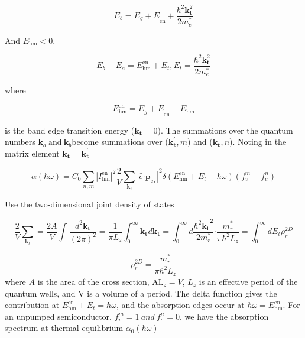 \begin{equation}
E_{b} = {E_{g} + E}_{\text{en}} + \frac{\hbar^{2}\bm{k}_{\bm{t}}^{2}}{2m_{e}^{*}}
\end{equation}

And \(E_{\text{hm}} < 0\),

\begin{equation}
E_{b} - E_{a} = E_{\text{hm}}^{\text{en}} + E_{t},
E_{t} = \frac{\hbar^{2}\bm{k}_{\bm{t}}^{2}}{2m_{e}^{*}}
\end{equation}

where

\begin{equation}
E_{\text{hm}}^{\text{en}} = {E_{g} + E}_{\text{en}} - E_{\text{hm}}
\end{equation}

is the band edge transition energy (\(\bm{k}_{\bm{t}} = 0\)).
The summations over the quantum numbers
\(\bm{k}_{a}\bm{\ }\text{and}\bm{\ }\bm{k}_{b}\)become
summations over (\(\bm{k}_{\bm{t}}^{\bm{'}},m\)) and
(\(\bm{k}_{\bm{t}},n\)). Noting in the matrix element
\(\bm{k}_{\bm{t}}\bm{=}\bm{k}_{\bm{t}}^{\bm{'}}\)

\begin{equation}
\alpha\left( \hbar\omega \right) = C_{0}\sum_{n,m}^{}\left| I_{\text{hm}}^{\text{en}} \right|^{2}\frac{2}{V}\sum_{\bm{k}_{t}}^{}\left| \hat{e}\bm{\cdot}\bm{p}_{\text{cv}} \right|^{2}\delta(E_{\text{hm}}^{\text{en}} + E_{t} - \hbar\omega)(f_{v}^{m} - f_{c}^{n})
\end{equation}

Use the two-dimensional joint density of states

\begin{equation}
\frac{2}{V}\sum_{\bm{k}_{t}}^{}{= \frac{2A}{V}}\int_{}^{}\frac{d^{2}\bm{k}_{\bm{t}}}{\left( 2\pi \right)^{2}} = \frac{1}{\pi L_{z}}\int_{0}^{\infty}\bm{k}_{\bm{t}}d\bm{k}_{\bm{t}}\bm{=}\int_{0}^{\infty}{d\frac{{{\hbar^{2}\bm{k}}_{\bm{t}}}^{\bm{2}}}{2m_{r}^{*}}}\bm{\cdot}\frac{m_{r}^{*}}{\pi\hbar^{2}L_{z}}\bm{=}\int_{0}^{\infty}{dE_{t}}\rho_{r}^{2D}
\end{equation}

\begin{equation}
\rho_{r}^{2D} = \frac{m_{r}^{*}}{\pi\hbar^{2}L_{z}}
\end{equation}
where \(A\) is the area of the cross section, \(\text{AL}_{z} = V\),
\(L_{z}\) is an effective period of the quantum wells, and V is a volume
of a period. The delta function gives the contribution at
\(E_{\text{hm}}^{\text{en}} + E_{t} = \hbar\omega\), and the
absorption edges occur at \(\hbar\omega = E_{\text{hm}}^{\text{en}}\).
For an unpumped semiconductor, \(f_{v}^{m} = 1\ and\ f_{c}^{n} = 0\), we
have the absorption spectrum at thermal equilibrium
\(\alpha_{0}\left( \hbar\omega \right)\)

